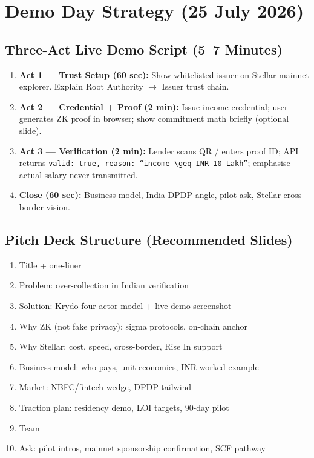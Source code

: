 \documentclass[11pt,a4paper]{article}
\newcommand{\krydo}{\textsf{Krydo}}
\newcommand{\stellar}{\textsf{Stellar}}
\begin{document}
\section{Demo Day Strategy (25 July 2026)}

\subsection{Three-Act Live Demo Script (5--7 Minutes)}

\begin{enumerate}
  \item \textbf{Act 1 --- Trust Setup (60 sec):} Show whitelisted issuer on \stellar{} mainnet explorer. Explain Root Authority $\rightarrow$ Issuer trust chain.
  \item \textbf{Act 2 --- Credential + Proof (2 min):} Issue income credential; user generates ZK proof in browser; show commitment math briefly (optional slide).
  \item \textbf{Act 3 --- Verification (2 min):} Lender scans QR / enters proof ID; API returns \texttt{valid: true, reason: ``income $\geq$ INR\,10\,Lakh''}; emphasise actual salary never transmitted.
  \item \textbf{Close (60 sec):} Business model, India DPDP angle, pilot ask, \stellar{} cross-border vision.
\end{enumerate}

\subsection{Pitch Deck Structure (Recommended Slides)}

\begin{enumerate}
  \item Title + one-liner
  \item Problem: over-collection in Indian verification
  \item Solution: \krydo{} four-actor model + live demo screenshot
  \item Why ZK (not fake privacy): sigma protocols, on-chain anchor
  \item Why \stellar{}: cost, speed, cross-border, Rise In support
  \item Business model: who pays, unit economics, INR worked example
  \item Market: NBFC/fintech wedge, DPDP tailwind
  \item Traction plan: residency demo, LOI targets, 90-day pilot
  \item Team
  \item Ask: pilot intros, mainnet sponsorship confirmation, SCF pathway
\end{enumerate}
\end{document}

